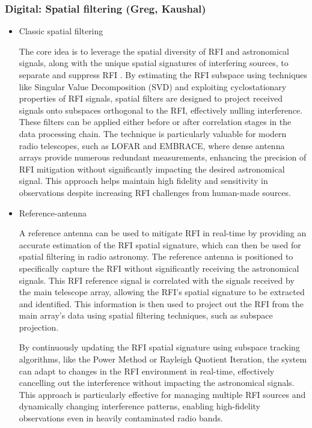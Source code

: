 \subsubsection{Digital: Spatial filtering (Greg, Kaushal)}
\begin{itemize}
\item Classic spatial filtering

The core idea is to leverage the spatial diversity of RFI and astronomical signals, along with the unique spatial signatures of interfering sources, to separate and suppress RFI \cite{hellbourg2014radio,hellbourg2016spatial,hellbourg2014rfi}. By estimating the RFI subspace using techniques like Singular Value Decomposition (SVD) and exploiting cyclostationary properties of RFI signals, spatial filters are designed to project received signals onto subspaces orthogonal to the RFI, effectively nulling interference. These filters can be applied either before or after correlation stages in the data processing chain. The technique is particularly valuable for modern radio telescopes, such as LOFAR and EMBRACE, where dense antenna arrays provide numerous redundant measurements, enhancing the precision of RFI mitigation without significantly impacting the desired astronomical signal. This approach helps maintain high fidelity and sensitivity in observations despite increasing RFI challenges from human-made sources.

\item Reference-antenna

A reference antenna can be used to mitigate RFI in real-time by providing an accurate estimation of the RFI spatial signature, which can then be used for spatial filtering in radio astronomy. The reference antenna is positioned to specifically capture the RFI without significantly receiving the astronomical signals. This RFI reference signal is correlated with the signals received by the main telescope array, allowing the RFI's spatial signature to be extracted and identified. This information is then used to project out the RFI from the main array's data using spatial filtering techniques, such as subspace projection.

By continuously updating the RFI spatial signature using subspace tracking algorithms, like the Power Method or Rayleigh Quotient Iteration, the system can adapt to changes in the RFI environment in real-time, effectively cancelling out the interference without impacting the astronomical signals. This approach is particularly effective for managing multiple RFI sources and dynamically changing interference patterns, enabling high-fidelity observations even in heavily contaminated radio bands\cite{hellbourg2014reference,sardarabadi2015spatial}.

\end{itemize}
